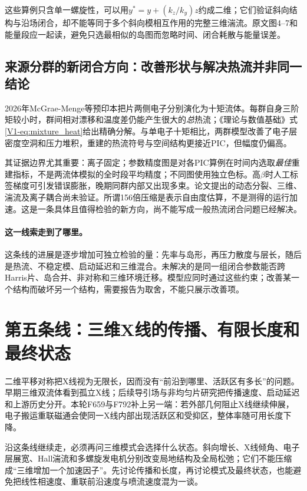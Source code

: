 \documentclass[UTF8,a4paper,11pt,openany,fontset=fandol]{ctexbook}
\begin{document}
这些算例只含单一螺旋性，可以用$y^*=y+(k_z/k_y)z$约成二维；它们验证斜向结构与沿场闭合，却不能等同于多个斜向模相互作用的完整三维湍流。原文图4--7和能量段应一起读，避免只选最相似的岛图而忽略时间、闭合耗散与能量误差。

\subsection{来源分群的新闭合方向：改善形状与解决热流并非同一结论}
2026年McGrae-Menge等预印本把片两侧电子分别演化为十矩流体。每群自身三阶矩较小时，群间相对漂移和温度差仍能产生很大的\emph{总}热流；《理论与数值基础》式\eqref{V1-eq:mixture_heat}给出精确分解。与单电子十矩相比，两群模型改善了电子层密度空洞和压力堆积，重建的热流符号与空间结构更接近PIC，但幅度仍偏高。\citep{F635}

其证据边界尤其重要：离子固定；参数精度图是对各PIC算例在时间内选取\emph{最佳}重建指标，不是两流体模拟的全时段平均精度；不同图使用独立色标。高$\beta$时人工标签梯度可引发错误膨胀，晚期同群内部又出现多束。论文提出的动态分裂、三维、湍流及离子耦合尚未验证。所谓156倍压缩是表示自由度估算，不是测得的运行加速。这是一条具体且值得检验的新方向，尚不能写成一般热流闭合问题已经解决。

\paragraph{这一线索走到了哪里。}这条线的进展是逐步增加可独立检验的量：先率与岛形，再压力散度与层长，随后是热流、不稳定模、启动延迟和三维混合。未解决的是同一组闭合参数能否跨Harris片、岛合并、非对称和三维环境迁移。模型应同时通过这些约束；改善某一个结构而破坏另一个结构，需要报告为取舍，不能只展示改善项。

\section{第五条线：三维X线的传播、有限长度和最终状态}\label{story:three}
二维平移对称把X线视为无限长，因而没有“前沿到哪里、活跃区有多长”的问题。早期三维双流体看到孤立X线；后续导引场与非均匀片研究把传播速度、启动延迟和上游历史分开。本轮F659与F792补上另一端：若外部几何阻止X线继续伸展，电子搬运重联磁通会使同一X线内部出现活跃区和受抑区，整体率随可用长度下降。

沿这条线继续走，必须再问三维模式会选择什么状态。斜向增长、X线倾角、电子层展宽、Hall湍流和多螺旋发电机分别改变局地结构及全局松弛；它们不能压缩成“三维增加一个加速因子”。先讨论传播和长度，再讨论模式及最终状态，也能避免把线性相速度、重联前沿速度与喷流速度混为一谈。
\end{document}
